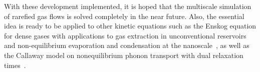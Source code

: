 \begin{enumerate}
\end{enumerate}  


With these development implemented, it is hoped that the multiscale simulation of rarefied gas flows is solved completely in the near future. Also, the essential idea is ready to be applied to other kinetic equations such as the Enskog equation for dense gases with applications to gas extraction in unconventional reservoirs and non-equilibrium evaporation and condensation at the nanoscale~\cite{Lei2015Enskog,Wu2016JFM}, as well as the Callaway model on nonequilibrium phonon transport with dual relaxation times~\cite{Liu2021Callway}.






%
%
